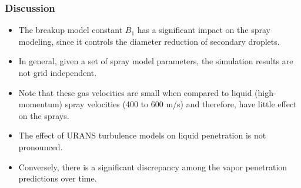 \subsubsection*{Discussion}
\begin{itemize}
    \item The breakup model constant $B_1$ has a significant impact on the spray modeling, since it controls the diameter reduction of secondary droplets.
    \item In general, given a set of spray model parameters, the simulation results are not grid independent.
    \item Note that these gas velocities are small when compared to liquid (high-momentum) spray velocities (400 to 600 m/s) and therefore, have little effect on the sprays.
    \item The effect of URANS turbulence models on liquid penetration is not pronounced.
    \item Conversely, there is a significant discrepancy among the vapor penetration predictions over time.
\end{itemize}
